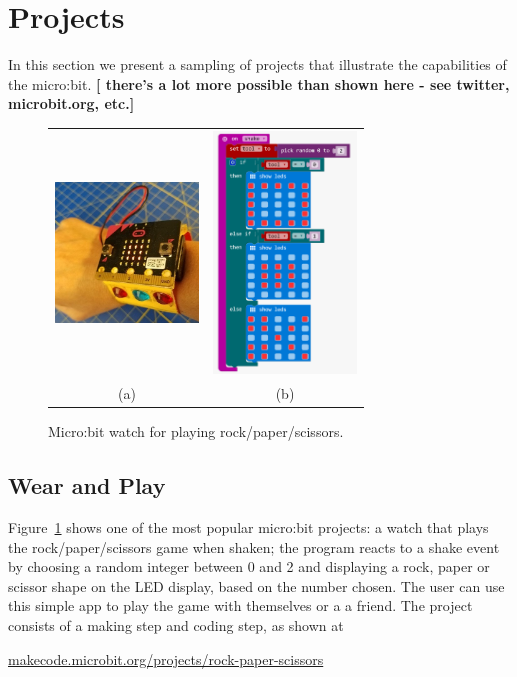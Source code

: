 \section{Projects}
\label{sec:projects}

In this section we present a sampling of projects that 
illustrate the capabilities of the micro:bit. {\bf [ there's a 
lot more possible than shown here - see twitter, microbit.org, etc.]}

\begin{figure}[t] 
    \begin{tabular}{cc}
        \includegraphics[width=1.5in]{images/rock-paper-scissors.jpg}  &
        \includegraphics[width=1.5in]{images/rpsBlocks.png} \\
        (a) & (b) 
      \end{tabular}
    \caption{\label{fig:rps}Micro:bit watch for playing rock/paper/scissors.}
\end{figure}

\subsection{Wear and Play}

Figure~\ref{fig:rps} shows one of the most popular micro:bit projects:
a watch that plays the rock/paper/scissors game when shaken; 
the program reacts to a shake event by choosing a random integer between 0 and 2
and displaying a rock, paper or scissor shape on the LED display, based
on the number chosen. The
user can use this simple app to play the game with themselves or a
a friend. The project consists of a making step and coding step,
as shown at
\begin{center}
\small{\url{makecode.microbit.org/projects/rock-paper-scissors}}
\end{center}

